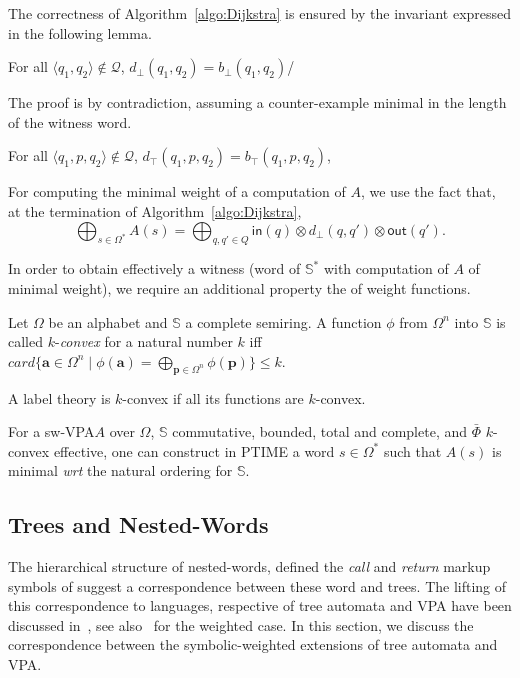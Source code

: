 \documentclass[runningheads]{llncs}
\def\wrt{\textit{wrt}\xspace}
\def\<#1>{\langle #1 \rangle}
\newcommand{\Q}{\mathcal{Q}}
\newcommand{\Semiring}{\mathbb{S}}
\def\SWVPA{\textsf{sw-VPA}\xspace}
\begin{document}
The correctness of Algorithm~\ref{algo:Dijkstra} 
is ensured by the invariant expressed in the following lemma.
\begin{lemma}\label{lem:bot}
For all $\< q_1, q_2> \notin \Q$,
$d_\bot(q_1, q_2) =  b_\bot(q_1, q_2)$/
\end{lemma}
The proof is by contradiction, 
assuming a counter-example minimal in the length of the witness word.

\begin{lemma}\label{lem:top}
For all $\< q_1, p, q_2> \notin \Q$, 
$d_\top(q_1, p, q_2) =  b_\top(q_1, p, q_2)$,
\end{lemma}

\noindent
For computing the minimal weight of a computation of $A$, we use the fact that,
at the termination of Algorithm~\ref{algo:Dijkstra}, %
\[
  {\displaystyle \bigoplus_{s \in \Omega^*} A(s)} = 
  {\displaystyle\bigoplus_{q, q' \in Q}} \textstyle
  \mathsf{in}(q) \mathop{\otimes} d_\bot(q, q') \mathop{\otimes} \mathsf{out}(q').
\]

\noindent
In order to obtain effectively a witness 
(word of $\Semiring^*$ with computation of $A$ of minimal weight), 
we require an additional property the of weight functions.
%
\begin{definition}
Let $\Omega$ be an alphabet and $\Semiring$ a complete semiring.
A function $\phi$ from $\Omega^n$ into $\Semiring$
is called $k$-\emph{convex} for a natural number $k$ iff 
$\mathit{card}\{ \mathbf{a} \in \Omega^n \mid \phi(\mathbf{a}) = 
                 \displaystyle\bigoplus_{\mathbf{p} \in \Omega^n} \phi(\mathbf{p}) \} \leq k$.
\end{definition}
A label theory is $k$-convex if all its functions are $k$-convex.


\begin{proposition}\label{th:best-search}
For a \SWVPA $A$ 
over $\Omega$, 
$\Semiring$ commutative, bounded, total and complete, %
and $\bar\Phi$ $k$-convex effective, %
one can construct in PTIME a word $s \in \Omega^*$ 
such that $A(s)$ is minimal \wrt the natural ordering for $\Semiring$. 
\end{proposition} 



\subsection{Trees and Nested-Words}
\label{sec:trees}
The hierarchical structure of nested-words, defined the \emph{call} and \emph{return} markup symbols of 
suggest a correspondence between these word and trees. 
The lifting of this correspondence to languages, respective of tree automata and VPA have
been discussed in~\cite{AlurMadhusudan09nested}, 
see also~\cite{Caralp12VPAmult} for the weighted case.
In this section, we discuss the correspondence between the symbolic-weighted extensions
of tree automata and VPA.
\end{document}
